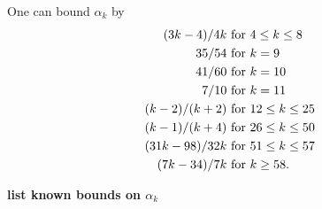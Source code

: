 \begin{theorem}\cite[Theorem 13.12]{ivic}  One can bound $\alpha_k$ by
    \begin{align*}
        (3k-4)/4k & \hbox{ for } 4 \leq k \leq 8 \\
        35/54 & \hbox{ for } k = 9 \\
        41/60 & \hbox{ for } k = 10 \\
        7/10 & \hbox{ for } k = 11 \\
        (k-2)/(k+2) & \hbox{ for } 12 \leq k \leq 25 \\
        (k-1)/(k+4) & \hbox{ for } 26 \leq k \leq 50 \\
        (31k-98)/32k & \hbox{ for } 51 \leq k \leq 57 \\
        (7k-34)/7k & \hbox{ for } k \geq 58.
    \end{align*}
\end{theorem}


{\bf list known bounds on $\alpha_k$}
